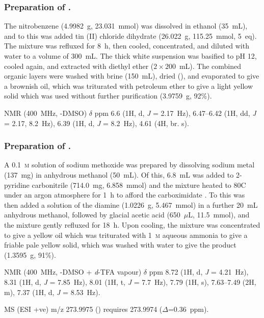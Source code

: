 \begin{refsection}
\subsubsection{Preparation of .}
The nitrobenzene (4.9982~g, 23.031~mmol) was dissolved in ethanol (35~mL), and to this was added tin (II) chloride dihydrate (26.022~g, 115.25~mmol, 5~eq).
The mixture was refluxed for 8~h, then cooled, concentrated, and diluted with water to a volume of 300~mL.
The thick white suspension was basified to pH 12, cooled again, and extracted with diethyl ether ($2\times200$~mL).
The combined organic layers were washed with brine (150~mL), dried (), and evaporated to give a brownish oil, which was triturated with petroleum ether to give a light yellow solid which was used without further purification (3.9759~g, 92\%).

 NMR (400~MHz, -DMSO) $\delta$ ppm 6.6 (1H, d, \emph{J} = 2.17~Hz), 6.47--6.42 (1H, dd, \emph{J} = 2.17, 8.2~Hz), 6.39 (1H, d, \emph{J} = 8.2~Hz), 4.61 (4H, br. s).

\subsubsection{Preparation of .}
A 0.1~\textsc{m} solution of sodium methoxide was prepared by dissolving sodium metal (137~mg) in anhydrous methanol (50~mL).
Of this, 6.8~mL was added to 2-pyridine carbonitrile (714.0~mg, 6.858~mmol) and the mixture heated to 80\degree C under an argon atmosphere for 1~h to afford the carboximidate .
To this was then added a solution of the diamine  (1.0226~g, 5.467~mmol) in a further 20~mL anhydrous methanol, followed by glacial acetic acid (650~$\mu$L, 11.5~mmol), and the mixture gently refluxed for 18~h.
Upon cooling, the mixture was concentrated to give a yellow oil which was triturated with 1~\textsc{m} aqueous ammonia to give a friable pale yellow solid, which was washed with water to give the product (1.3595~g, 91\%).

 NMR (400~MHz, -DMSO + \textit{d}-TFA vapour) $\delta$ ppm 8.72 (1H, d, \emph{J} = 4.21~Hz), 8.31 (1H, d, \emph{J} = 7.85~Hz), 8.01 (1H, t, \emph{J} = 7.7~Hz), 7.79 (1H, s), 7.63--7.49 (2H, m), 7.37 (1H, d, \emph{J} = 8.53~Hz).

MS (ESI +ve) m/z 273.9975 ()  requires 273.9974 ($\Delta$=0.36~ppm).


\end{refsection}
